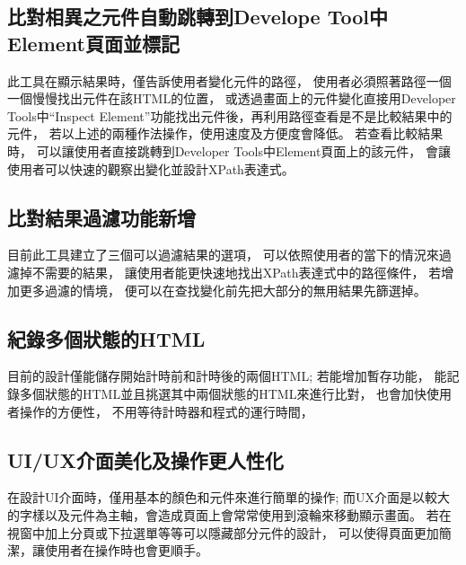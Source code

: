 \subsection{比對相異之元件自動跳轉到Develope Tool中Element頁面並標記}\label{s5.2.2}

此工具在顯示結果時，僅告訴使用者變化元件的路徑，
使用者必須照著路徑一個一個慢慢找出元件在該HTML的位置，
或透過畫面上的元件變化直接用Developer Tools中``Inspect Element''功能找出元件後，再利用路徑查看是不是比較結果中的元件，
若以上述的兩種作法操作，使用速度及方便度會降低。
若查看比較結果時，
可以讓使用者直接跳轉到Developer Tools中Element頁面上的該元件，
會讓使用者可以快速的觀察出變化並設計XPath表達式。

\subsection{比對結果過濾功能新增}\label{s5.2.3}

目前此工具建立了三個可以過濾結果的選項，
可以依照使用者的當下的情況來過濾掉不需要的結果，
讓使用者能更快速地找出XPath表達式中的路徑條件，
若增加更多過濾的情境，
便可以在查找變化前先把大部分的無用結果先篩選掉。

\subsection{紀錄多個狀態的HTML}\label{s5.2.4}

目前的設計僅能儲存開始計時前和計時後的兩個HTML;
若能增加暫存功能，
能記錄多個狀態的HTML並且挑選其中兩個狀態的HTML來進行比對，
也會加快使用者操作的方便性，
不用等待計時器和程式的運行時間，

\subsection{UI/UX介面美化及操作更人性化}\label{s5.2.5}

在設計UI介面時，僅用基本的顏色和元件來進行簡單的操作;
而UX介面是以較大的字樣以及元件為主軸，會造成頁面上會常常使用到滾輪來移動顯示畫面。
若在視窗中加上分頁或下拉選單等等可以隱藏部分元件的設計，
可以使得頁面更加簡潔，讓使用者在操作時也會更順手。